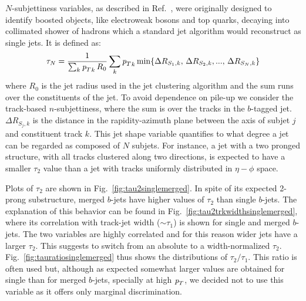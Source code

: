 $N$-subjettiness variables, as described in Ref.~\cite{nsubjettiness}, were originally designed to identify boosted objects, like electroweak bosons and top quarks, decaying into collimated shower of hadrons which a standard jet algorithm would reconstruct as single jets. It is defined as:
\begin{equation} 
\tau_N = \frac{1}{\sum_k {{\emph{p}_{T}}}_k\,R_0} \sum_k {{\emph{p}_{T}}}_k \min \{ \Delta R_{S_1,k},\,\Delta R_{S_2,k},...,\,\Delta R_{S_N,k} \}
\end{equation} 
where $R_0$ is the jet radius used in the jet clustering algorithm and the sum runs over the constituents of the jet. To avoid dependence on pile-up we consider the track-based $n$-subjettiness, where the sum 
 is over the tracks in the $b$-tagged jet. $\Delta R_{S_j,k} $ is the distance in the rapidity-azimuth plane between the axis of subjet $j$ and constituent track $k$. This jet shape variable quantifies to what degree a jet can be regarded as composed of $N$ subjets. For instance, a jet with a two pronged structure, with all tracks clustered along two directions, is expected to have a smaller $\tau_2$ value than a jet with tracks uniformly distributed in $\eta-\phi$ space.

Plots of $ \tau_2$ are shown in Fig.~\ref{fig:tau2singlemerged}. In spite of its expected 2-prong substructure, merged $b$-jets have higher values of $ \tau_2$ than single $b$-jets. The explanation of this behavior can be found in Fig.~\ref{fig:tau2trkwidthsinglemerged}, where its correlation with  track-jet width ($\sim \tau_1$) is shown for single and merged $b$-jets. The two variables are highly correlated and for this reason wider jets  have a larger $ \tau_2$. This suggests to switch from an absolute to a width-normalized
$\tau_2$. Fig.~\ref{fig:tauratiosinglemerged} thus shows the distributions of $\tau_2/\tau_1$. This ratio is often used but, although as expected somewhat larger values are obtained for single than for merged $b$-jets, specially at high ${\emph{p}_{T}}$, we decided not to use this variable as it offers only marginal discrimination. 
\\[3mm]

